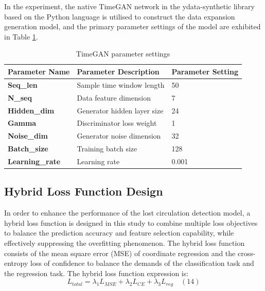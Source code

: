 \documentclass[journal,article,submit,pdftex,moreauthors]{Definitions/mdpi}
\begin{document}
In the experiment, the native TimeGAN network in the ydata-synthetic library     based on the Python language is utilised to construct the data expansion generation model, and the primary parameter settings of the model are exhibited in Table \ref{TimeGAN parameter settings}.

\begin{table}[H]
\centering
\caption{TimeGAN parameter settings}
\begin{tabular}{lll}
\toprule
\textbf{Parameter Name} & \textbf{Parameter Description} & \textbf{Parameter Setting} \\ 
\midrule
\textbf{Seq\_len}       & Sample time window length      & 50                          \\ 
\textbf{N\_seq}         & Data feature dimension         & 7                           \\ 
\textbf{Hidden\_dim}    & Generator hidden layer size    & 24                          \\ 
\textbf{Gamma}          & Discriminator loss weight      & 1                           \\ 
\textbf{Noise\_dim}     & Generator noise dimension      & 32                          \\ 
\textbf{Batch\_size}    & Training batch size            & 128                         \\ 
\textbf{Learning\_rate} & Learning rate                  & 0.001                       \\ 
\bottomrule
\end{tabular}

\label{TimeGAN parameter settings}
\end{table}

\subsection{Hybrid Loss Function Design }
 
In order to enhance the performance of the lost circulation detection model, a hybrid loss function is designed in this study to combine multiple loss objectives to balance the prediction accuracy and feature selection capability, while effectively suppressing the overfitting phenomenon. The hybrid loss function consists of the mean square error (MSE) of coordinate regression and the cross-entropy loss of confidence to balance the demands of the classification task and the regression task. The hybrid loss function expression is:
$$ L _ { t o t a l } = \lambda _ { 1 } L _ { M S E } + \lambda _ { 2 } L _ { C E } + \lambda _ { 3 } L _ { r e g }\quad (14)$$
\end{document}
